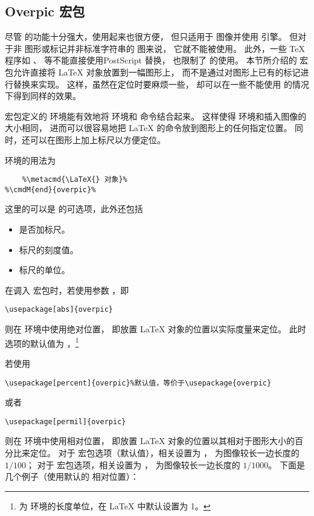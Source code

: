 \subsection{Overpic 宏包}\label{ssec:overpic}

尽管  的功能十分强大，使用起来也很方便，
但只适用于  图像并使用  引擎。
但对于非  图形或标记并非标准字符串的  图来说，
它就不能被使用。
此外，一些 \TeX{} 程序如 、\pdfLaTeX{} 等不能直接使用PostScript 替换，
也限制了  的使用。
本节所介绍的  宏包允许直接将 \LaTeX{} 对象放置到一幅图形上，
而不是通过对图形上已有的标记进行替换来实现。
这样，虽然在定位时要麻烦一些，
却可以在一些不能使用  的情况下得到同样的效果。

 宏包定义的  环境能有效地将  环境和  命令结合起来。
这样使得  环境和插入图像的大小相同，
进而可以很容易地把 \LaTeX{} 的命令放到图形上的任何指定位置。
同时，还可以在图形上加上标尺以方便定位。

 环境的用法为
\begin{lstlisting}[escapechar=\%]
%\cmdMOM{begin}{overpic}{\metacmd{选项}}{\metacmd{图形}}%
	%\metacmd{\LaTeX{} 对象}%
%\cmdM{end}{overpic}%
\end{lstlisting}
这里的可以是  的可选项，此外还包括
\begin{itemize}
	\item {} 是否加标尺。
	\item {} 标尺的刻度值。
	\item {} 标尺的单位。
\end{itemize}

在调入  宏包时，若使用参数 ，即
\begin{lstlisting}
\usepackage[abs]{overpic}
\end{lstlisting}
则在  环境中使用绝对位置，
即放置 \LaTeX{} 对象的位置以实际度量来定位。
此时  选项的默认值为 ，\footnote{
	 为  环境的长度单位，在 \LaTeX{} 中默认设置为 1\pt。}


若使用
\begin{lstlisting}
\usepackage[percent]{overpic}%默认值，等价于\usepackage{overpic}
\end{lstlisting}
或者
\begin{lstlisting}
\usepackage[permil]{overpic}
\end{lstlisting}
则在  环境中使用相对位置，
即放置 \LaTeX{} 对象的位置以其相对于图形大小的百分比来定位。
对于  宏包选项（默认值），相关设置为 ，
 为图像较长一边长度的 $1/100$；
对于  宏包选项，相关设置为 ，
 为图像较长一边长度的 $1/1000$。
下面是几个例子（使用默认的  相对位置）：

